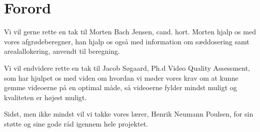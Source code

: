 \section{Forord}
Vi vil gerne rette en tak til Morten Bach Jensen, cand. hort. Morten hjalp os med vores afgrødeberegner, han hjalp os også med information om sæddosering samt arealallokering, anvendt til beregning.

Vi vil endvidere rette en tak til Jacob Søgaard, Ph.d Video Quality Assessment, som har hjulpet os med viden om hvordan vi møder vores krav om at kunne gemme videoerne på en optimal måde, så videoerne fylder mindst muligt og kvaliteten er højest muligt.

Sidst, men ikke mindst vil vi takke vores lærer, Henrik Neumann Poulsen, for sin støtte og sine gode råd igennem hele projektet.